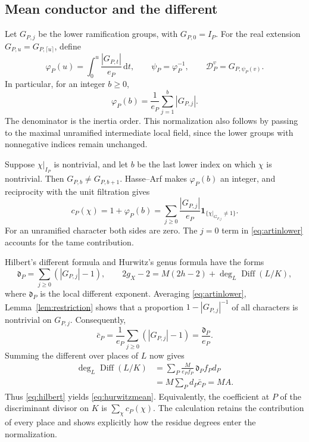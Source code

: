 \documentclass[12pt,onecolumn,draftclsnofoot,letterpaper]{IEEEtran}
\theoremstyle{remark}
\newcommand{\Diff}{\operatorname{Diff}}
\newcommand{\one}{\mathbf 1}
\newcommand{\dd}{\mathrm d}
\begin{document}
\subsection{Mean conductor and the different}
Let $G_{P,j}$ be the lower ramification groups, with $G_{P,0}=I_P$. For the real extension $G_{P,u}=G_{P,\lceil u\rceil}$, define
\begin{equation}
 \varphi_P(u)=\int_0^u\frac{|G_{P,t}|}{e_P}\,\dd t,
 \qquad \psi_P=\varphi_P^{-1},\qquad
 \mathcal D_P^v=G_{P,\psi_P(v)}.
 \label{eq:herbrand}
\end{equation}
In particular, for an integer $b\ge0$,
\begin{equation}
 \varphi_P(b)=\frac1{e_P}\sum_{j=1}^{b}|G_{P,j}|.
 \label{eq:herbrandinteger}
\end{equation}
The denominator is the inertia order. This normalization also follows by passing to the maximal unramified intermediate local field, since the lower groups with nonnegative indices remain unchanged.

Suppose $\chi|_{I_P}$ is nontrivial, and let $b$ be the last lower index on which $\chi$ is nontrivial. Then $G_{P,b}\ne G_{P,b+1}$. Hasse--Arf makes $\varphi_P(b)$ an integer, and reciprocity with the unit filtration gives
\begin{equation}
 c_P(\chi)=1+\varphi_P(b)
 =\sum_{j\ge0}\frac{|G_{P,j}|}{e_P}
       \one_{\{\chi|_{G_{P,j}}\ne1\}}.
 \label{eq:artinlower}
\end{equation}
For an unramified character both sides are zero. The $j=0$ term in \eqref{eq:artinlower} accounts for the tame contribution.

Hilbert's different formula and Hurwitz's genus formula have the forms \cite[Ths.~3.8.7 and 3.4.13]{stichtenoth}
\begin{equation}
 \mathfrak d_P=\sum_{j\ge0}(|G_{P,j}|-1),\qquad
 2g_X-2=M(2h-2)+\deg_L\Diff(L/K),
 \label{eq:hilbert}
\end{equation}
where $\mathfrak d_P$ is the local different exponent. Averaging \eqref{eq:artinlower}, Lemma~\ref{lem:restriction} shows that a proportion $1-|G_{P,j}|^{-1}$ of all characters is nontrivial on $G_{P,j}$. Consequently,
\begin{equation}
 \bar c_P=\frac1{e_P}\sum_{j\ge0}(|G_{P,j}|-1)
 =\frac{\mathfrak d_P}{e_P}.
 \label{eq:differentmean}
\end{equation}
Summing the different over places of $L$ now gives
\begin{align}
 \deg_L\Diff(L/K)
 &=\sum_P\frac{M}{e_Pf_P}\,\mathfrak d_P f_Pd_P\\
 &=M\sum_Pd_P\bar c_P=MA.
 \label{eq:globaldifferent}
\end{align}
Thus \eqref{eq:hilbert} yields \eqref{eq:hurwitzmean}. Equivalently, the coefficient at $P$ of the discriminant divisor on $K$ is $\sum_{\chi}c_P(\chi)$. The calculation retains the contribution of every place and shows explicitly how the residue degrees enter the normalization.
\end{document}
